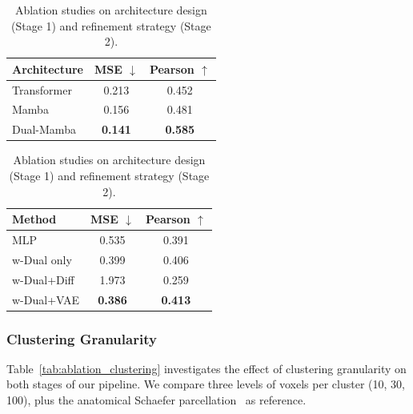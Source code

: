 \begin{table}[t]
\centering
\caption{Ablation studies on architecture design (Stage 1) and refinement strategy (Stage 2).}
\label{tab:ablation_stages}
\begin{minipage}{0.48\linewidth}
\centering
{}
\label{tab:ablation_stage1}
\begin{tabular}{lcc}
\toprule
\textbf{Architecture} & \textbf{MSE} $\downarrow$ & \textbf{Pearson} $\uparrow$ \\
\midrule
Transformer & 0.213 & 0.452 \\
Mamba & 0.156 & 0.481 \\
\midrule
Dual-Mamba & \textbf{0.141} & \textbf{0.585} \\
\bottomrule
\end{tabular}
\end{minipage}%
\hfill
\begin{minipage}{0.48\linewidth}
\centering
{}
\label{tab:ablation_stage2}
\begin{tabular}{lcc}
\toprule
\textbf{Method} & \textbf{MSE} $\downarrow$ & \textbf{Pearson} $\uparrow$ \\
\midrule
MLP & 0.535 & 0.391 \\
w-Dual only & 0.399 & 0.406 \\
w-Dual+Diff & 1.973 & 0.259 \\
\midrule
w-Dual+VAE & \textbf{0.386} & \textbf{0.413} \\
\bottomrule
\end{tabular}
\end{minipage}
\end{table}


\subsubsection{Clustering Granularity}

Table~\ref{tab:ablation_clustering} investigates the effect of clustering granularity
on both stages of our pipeline.
We compare three levels of voxels per cluster (10, 30, 100),
plus the anatomical Schaefer parcellation~\cite{schaefer2018local} as reference.

